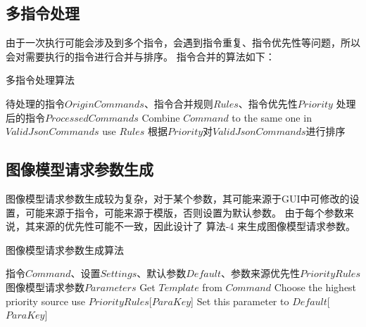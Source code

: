 \documentclass[a4paper,AutoFakeBold,oneside,12pt]{book}
\begin{document}
\subsection{多指令处理}
由于一次执行可能会涉及到多个指令，会遇到指令重复、指令优先性等问题，所以会对需要执行的指令进行合并与排序。
指令合并的算法如下：
\begin{algorithm} 
	\begin{spacing}{1.3}
		\caption{多指令处理算法} 
		\label{JsonCommandsProcessingAlgorithm}
		\renewcommand{\algorithmicrequire}{\textbf{输入：}}
		\renewcommand{\algorithmicensure}{\textbf{输出：}} 
			\begin{algorithmic}[1] 
				\Require 待处理的指令$OriginCommands$、指令合并规则$Rules$、指令优先性$Priority$
				\Ensure 处理后的指令$ProcessedCommands$
                        \State Combine $Command$ to the same one in $ValidJsonCommands$ use $Rules$
                    \EndIf
                \EndFor
                \State 根据$Priority$对$ValidJsonCommands$进行排序
			\end{algorithmic}
	\end{spacing}
\end{algorithm}

\subsection{图像模型请求参数生成}
图像模型请求参数生成较为复杂，对于某个参数，其可能来源于GUI中可修改的设置，可能来源于指令，可能来源于模版，否则设置为默认参数。
由于每个参数来说，其来源的优先性可能不一致，因此设计了 算法-4 来生成图像模型请求参数。
\begin{algorithm} 
	\begin{spacing}{1.3}
		\caption{图像模型请求参数生成算法} 
		\label{ImageParasGenAlgorithm}
		\renewcommand{\algorithmicrequire}{\textbf{输入：}}
		\renewcommand{\algorithmicensure}{\textbf{输出：}} 
			\begin{algorithmic}[1] 
				\Require 指令$Command$、设置$Settings$、默认参数$Default$、参数来源优先性$PriorityRules$
				\Ensure 图像模型请求参数$Parameters$
                    \State Get $Template$ from $Command$
                        \State Choose the highest priority source use $PriorityRules$[$ParaKey$]
                    \Else
                        \State Set this parameter to $Default$[$ParaKey$]
                    \EndIf
                \EndFor
			\end{algorithmic}
	\end{spacing}
\end{algorithm}
\end{document}
